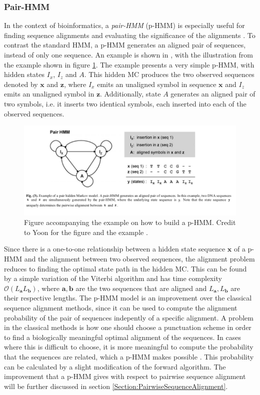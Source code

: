 \documentclass{article}\usepackage[]{graphicx}\usepackage[]{color}
\begin{document}
\subsubsection{Pair-HMM}
In the context of bioinformatics, a \textit{pair-HMM} (p-HMM) is especially useful for finding sequence alignments and evaluating the significance of the alignments \cite{Yoon2009}. To contrast the standard HMM, a p-HMM generates an aligned pair of sequences, instead of only one sequence. An example is shown in \cite{Yoon2009}, with the illustration from the example shown in figure \ref{fig:Yoon2009PairHMMExample}. The example presents a very simple p-HMM, with hidden states $I_x$, $I_z$ and $A$. This hidden MC produces the two observed sequences denoted by $\mathbf{x}$ and $\mathbf{z}$, where $I_x$ emits an unaligned symbol in sequence $\mathbf{x}$ and $I_z$ emits an unaligned symbol in $\mathbf{z}$. Additionally, state $A$ generates an aligned pair of two symbols, i.e. it inserts two identical symbols, each inserted into each of the observed sequences.  

\begin{figure}[h]
    \centering
    \includegraphics[width = \textwidth]{examplePairHMMYoon.png}
    \caption{Figure accompanying the example on how to build a p-HMM. Credit to Yoon for the figure and the example \cite{Yoon2009}.}
    \label{fig:Yoon2009PairHMMExample}
\end{figure}

Since there is a one-to-one relationship between a hidden state sequence $\mathbf{x}$ of a p-HMM and the alignment between two observed sequences, the alignment problem reduces to finding the optimal state path in the hidden MC. This can be found by a simple variation of the Viterbi algorithm and has time complexity $\mathcal{O}(L_\mathbf{a}L_\mathbf{b})$, where $\mathbf{a}, \mathbf{b}$ are the two sequences that are aligned and $L_\mathbf{a}, L_\mathbf{b}$ are their respective lengths. The p-HMM model is an improvement over the classical sequence alignment methods, since it can be used to compute the alignment probability of the pair of sequences indepently of a specific alignment. A problem in the classical methods is how one should choose a punctuation scheme in order to find a biologically meaningful optimal alignment of the sequences. In cases where this is difficult to choose, it is more meaningful to compute the probability that the sequences are related, which a p-HMM makes possible \cite{Yoon2009}. This probability can be calculated by a slight modification of the forward algorithm. The improvement that a p-HMM gives with respect to pairwise sequence alignment will be further discussed in section \ref{Section:PairwiseSequenceAlignment}.
\end{document}
